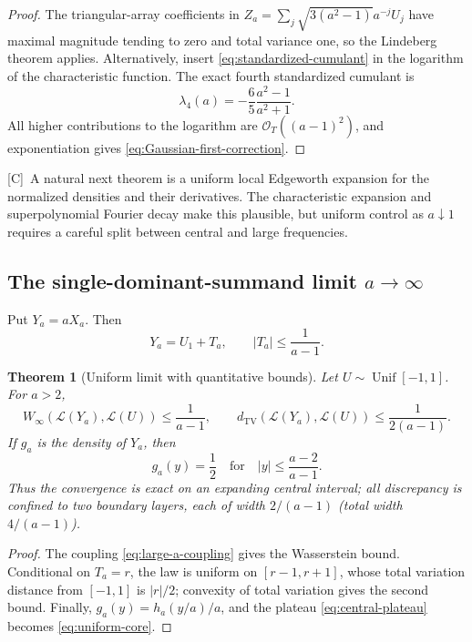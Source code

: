 \documentclass[11pt,oneside]{article}
\newtheorem{theorem}{Theorem}[section]
\theoremstyle{definition}
\theoremstyle{remark}
\newcommand{\bigO}{\mathcal O}
\newcommand{\TV}{d_{\mathrm{TV}}}
\newcommand{\Wass}{W_{\infty}}
\newcommand{\Cmark}{\textcolor{conjecturered}{\textsf{[C]}}}
\begin{document}
\begin{proof}
The triangular-array coefficients in
$Z_a=\sum_j\sqrt{3(a^2-1)}a^{-j}U_j$ have maximal magnitude tending to zero and total
variance one, so the Lindeberg theorem applies.  Alternatively, insert
\eqref{eq:standardized-cumulant} in the logarithm of the characteristic function.  The exact
fourth standardized cumulant is
\begin{equation}
 \lambda_4(a)=-\frac65\frac{a^2-1}{a^2+1}.
 \label{eq:lambda4}
\end{equation}
All higher contributions to the logarithm are $\bigO_T((a-1)^2)$, and exponentiation gives
\eqref{eq:Gaussian-first-correction}.
\end{proof}

\Cmark\ A natural next theorem is a uniform local Edgeworth expansion for the normalized
densities and their derivatives.  The characteristic expansion and superpolynomial Fourier
decay make this plausible, but uniform control as $a\downarrow1$ requires a careful split
between central and large frequencies.

\subsection{The single-dominant-summand limit $a\to\infty$}

Put $Y_a=aX_a$.  Then
\begin{equation}
 Y_a=U_1+T_a,
 \qquad
 |T_a|\le\frac1{a-1}.
 \label{eq:large-a-coupling}
\end{equation}

\begin{theorem}[Uniform limit with quantitative bounds]
\label{thm:uniform-limit}
Let $U\sim\operatorname{Unif}[-1,1]$.  For $a>2$,
\begin{equation}
 \Wass(\mathcal L(Y_a),\mathcal L(U))\le\frac1{a-1},
 \qquad
 \TV(\mathcal L(Y_a),\mathcal L(U))\le\frac1{2(a-1)}.
 \label{eq:uniform-bounds}
\end{equation}
If $g_a$ is the density of $Y_a$, then
\begin{equation}
 g_a(y)=\frac12
 \quad\text{for}\quad
 |y|\le\frac{a-2}{a-1}.
 \label{eq:uniform-core}
\end{equation}
Thus the convergence is exact on an expanding central interval; all discrepancy is confined
to two boundary layers, each of width $2/(a-1)$ (total width $4/(a-1)$).
\end{theorem}

\begin{proof}
The coupling \eqref{eq:large-a-coupling} gives the Wasserstein bound.  Conditional on
$T_a=r$, the law is uniform on $[r-1,r+1]$, whose total variation distance from
$[-1,1]$ is $|r|/2$; convexity of total variation gives the second bound.  Finally,
$g_a(y)=h_a(y/a)/a$, and the plateau \eqref{eq:central-plateau} becomes
\eqref{eq:uniform-core}.
\end{proof}
\end{document}
